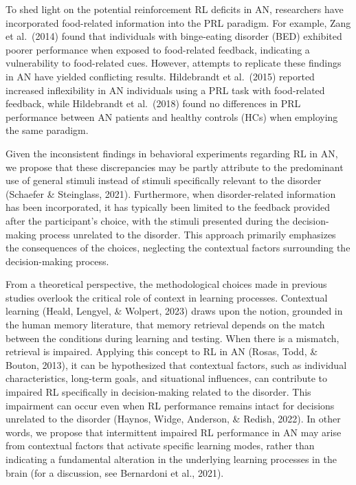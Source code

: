 \documentclass[
  man,floatsintext]{apa6}
\begin{document}
To shed light on the potential reinforcement RL deficits in AN, researchers have incorporated food-related information into the PRL paradigm. For example, Zang et al.~(2014) found that individuals with binge-eating disorder (BED) exhibited poorer performance when exposed to food-related feedback, indicating a vulnerability to food-related cues. However, attempts to replicate these findings in AN have yielded conflicting results. Hildebrandt et al.~(2015) reported increased inflexibility in AN individuals using a PRL task with food-related feedback, while Hildebrandt et al.~(2018) found no differences in PRL performance between AN patients and healthy controls (HCs) when employing the same paradigm.

Given the inconsistent findings in behavioral experiments regarding RL in AN, we propose that these discrepancies may be partly attribute to the predominant use of general stimuli instead of stimuli specifically relevant to the disorder (Schaefer \& Steinglass, 2021). Furthermore, when disorder-related information has been incorporated, it has typically been limited to the feedback provided after the participant's choice, with the stimuli presented during the decision-making process unrelated to the disorder. This approach primarily emphasizes the consequences of the choices, neglecting the contextual factors surrounding the decision-making process.

From a theoretical perspective, the methodological choices made in previous studies overlook the critical role of context in learning processes. Contextual learning (Heald, Lengyel, \& Wolpert, 2023) draws upon the notion, grounded in the human memory literature, that memory retrieval depends on the match between the conditions during learning and testing. When there is a mismatch, retrieval is impaired. Applying this concept to RL in AN (Rosas, Todd, \& Bouton, 2013), it can be hypothesized that contextual factors, such as individual characteristics, long-term goals, and situational influences, can contribute to impaired RL specifically in decision-making related to the disorder. This impairment can occur even when RL performance remains intact for decisions unrelated to the disorder (Haynos, Widge, Anderson, \& Redish, 2022). In other words, we propose that intermittent impaired RL performance in AN may arise from contextual factors that activate specific learning modes, rather than indicating a fundamental alteration in the underlying learning processes in the brain (for a discussion, see Bernardoni et al., 2021).
\end{document}
